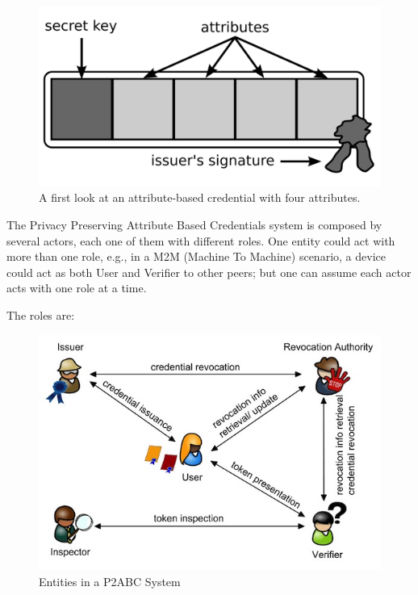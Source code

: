\begin{figure}[bth]
	\begin{center}
		\includegraphics[width=0.4\linewidth]{gfx/ABC}
	\end{center}
	\caption{A first look at an attribute-based credential with four attributes.}
	\label{fig:abc}
\end{figure}



The Privacy Preserving Attribute Based Credentials system is composed by several actors, each one of them with different roles. One entity could act with more than one role, e.g., in a M2M (Machine To Machine) scenario, a device could act as both User and Verifier to other peers; but one can assume each actor acts with one role at a time.


The roles are:


\begin{figure}[bth]
	\begin{center}
		\includegraphics[width=\linewidth]{gfx/actors}
	\end{center}
	\caption{Entities in a P2ABC System}
	\label{fig:actors}
\end{figure}

